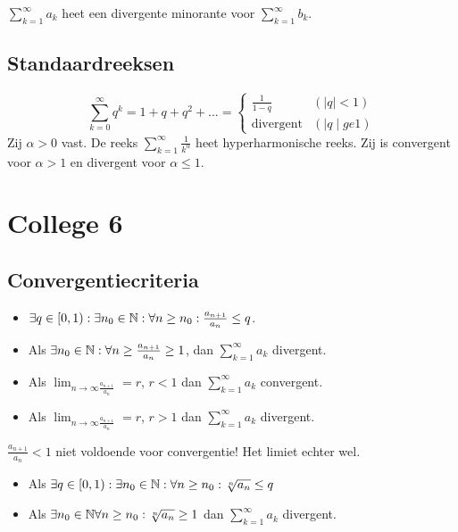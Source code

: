 \documentclass[week=1]{homework}
\begin{document}
	\Def $\sum_{k=1}^{\infty} a_k$ heet een divergente minorante voor $\sum_{k=1}^{\infty} b_k$.
	
	\subsection*{Standaardreeksen}
	\[
		\sum_{k=0}^{\infty} q^k = 1 + q + q^2 + ... = \begin{cases}
			\frac{1}{1-q} &(\mid q \mid < 1) \\
			\text{divergent} &(\mid q \mid ge 1)
		\end{cases}
	\]
	 Zij $\alpha > 0$ vast. De reeks $\sum_{k=1}^{\infty} \frac{1}{k^{\alpha}}$ heet hyperharmonische reeks. Zij is convergent voor $\alpha > 1$ en divergent voor $\alpha \le 1$. 
	
	\newpage
	\section*{College 6}
	
	\subsection*{Convergentiecriteria}
	\begin{itemize}
		\item $\exists q \in [0,1): \exists n_0 \in \mathbb{N}: \forall n \ge n_0: \frac{a_{n+1}}{a_n} \le q$. 
		\item Als $\exists n_0 \in \mathbb{N}: \forall n \ge \frac{a_{n+1}}{a_n} \ge 1$, dan $\sum_{k=1}^{\infty} a_k$ divergent. 
	\end{itemize}
	
	\Gevolg \begin{itemize}
		\item Als $\lim_{n \rightarrow \infty \frac{a_{n+1}}{a_n}} = r$, $r < 1$ dan $\sum_{k=1}^{\infty} a_k$ convergent. 
		\item Als $\lim_{n \rightarrow \infty \frac{a_{n+1}}{a_n}} = r$, $r > 1$ dan $\sum_{k=1}^{\infty} a_k$ divergent. 
	\end{itemize}
	
	\Letop $\frac{a_{n+1}}{a_n} < 1$ niet voldoende voor convergentie! Het limiet echter wel. 
	
	\Stel[Wortelcriterium] \begin{itemize}
		\item Als $\exists q \in [0,1): \exists n_0 \in \mathbb{N}: \forall n \ge n_0: \sqrt[n]{a_n} \le q$ 
		\item Als $\exists n_0 \in \mathbb{N} \forall n \ge n_0: \sqrt[n]{a_n} \ge 1$ dan $\sum_{k=1}^{\infty} a_k$ divergent. 
	\end{itemize}
	
\end{document}
